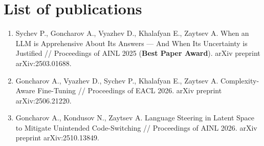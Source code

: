 \chapter{List of publications}

\begin{enumerate}
    \item Sychev P., Goncharov A., Vyazhev D., Khalafyan E., Zaytsev A. When an LLM is Apprehensive About Its Answers --- And When Its Uncertainty is Justified // Proceedings of AINL 2025 (\textbf{Best Paper Award}). arXiv preprint arXiv:2503.01688.

    \item Goncharov A., Vyazhev D., Sychev P., Khalafyan E., Zaytsev A. Complexity-Aware Fine-Tuning // Proceedings of EACL 2026. arXiv preprint arXiv:2506.21220.

    \item Goncharov A., Kondusov N., Zaytsev A. Language Steering in Latent Space to Mitigate Unintended Code-Switching // Proceedings of AINL 2026. arXiv preprint arXiv:2510.13849.
\end{enumerate}
